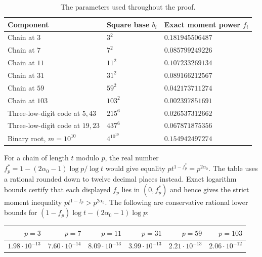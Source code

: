 \documentclass[11pt]{article}
\theoremstyle{definition}
\theoremstyle{remark}
\newcommand{\al}{\alpha_0}
\begin{document}
\begin{table}[ht]
\centering
\begin{tabular}{lll}\toprule
Component&Square base $b_i$&Exact moment power $f_i$\\\midrule
Chain at $3$&$3^2$&$0.181945506487$\\
Chain at $7$&$7^2$&$0.085799249226$\\
Chain at $11$&$11^2$&$0.107233269134$\\
Chain at $31$&$31^2$&$0.089166212567$\\
Chain at $59$&$59^2$&$0.042173711274$\\
Chain at $103$&$103^2$&$0.002397851691$\\
Three-low-digit code at $5,43$&$215^6$&$0.026537312662$\\
Three-low-digit code at $19,23$&$437^6$&$0.067871875356$\\
Binary root, $m=10^{10}$&$4^{10^{10}}$&$0.154942497274$\\\bottomrule
\end{tabular}
\caption{The parameters used throughout the proof.}\label{tab:powers}
\end{table}

For a chain of length $t$ modulo $p$, the real number
$f_p^*=1-(2\al-1)\log p/\log t$ would give equality
$pt^{1-f_p^*}=p^{2\al}$. The table uses a rational rounded down to twelve
decimal places instead. Exact logarithm bounds certify that each displayed
$f_p$ lies in $(0,f_p^*)$ and hence gives the strict moment inequality
$pt^{1-f_p}>p^{2\al}$. The following are conservative rational lower
bounds for $(1-f_p)\log t-(2\al-1)\log p$:
\begin{center}
\begin{tabular}{rrrrrr}\toprule
$p=3$&$p=7$&$p=11$&$p=31$&$p=59$&$p=103$\\\midrule
$1.98\cdot10^{-13}$&$7.60\cdot10^{-14}$&$8.09\cdot10^{-13}$&
$3.99\cdot10^{-13}$&$2.21\cdot10^{-13}$&$2.06\cdot10^{-12}$\\\bottomrule
\end{tabular}
\end{center}
\end{document}
